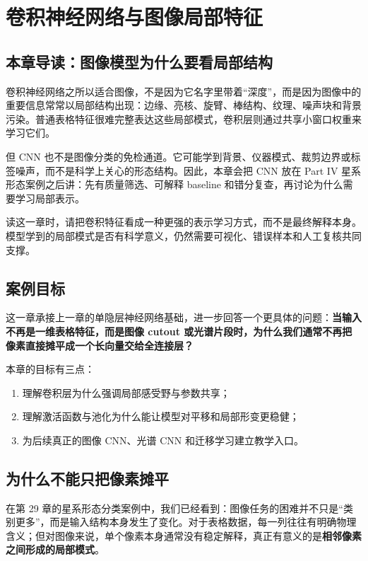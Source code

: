 \chapter{卷积神经网络与图像局部特征}

\section{本章导读：图像模型为什么要看局部结构}

卷积神经网络之所以适合图像，不是因为它名字里带着“深度”，而是因为图像中的重要信息常常以局部结构出现：边缘、亮核、旋臂、棒结构、纹理、噪声块和背景污染。普通表格特征很难完整表达这些局部模式，卷积层则通过共享小窗口权重来学习它们。

但 CNN 也不是图像分类的免检通道。它可能学到背景、仪器模式、裁剪边界或标签噪声，而不是科学上关心的形态结构。因此，本章会把 CNN 放在 Part IV 星系形态案例之后讲：先有质量筛选、可解释 baseline 和错分复查，再讨论为什么需要学习局部表示。

读这一章时，请把卷积特征看成一种更强的表示学习方式，而不是最终解释本身。模型学到的局部模式是否有科学意义，仍然需要可视化、错误样本和人工复核共同支撑。

\section{案例目标}

这一章承接上一章的单隐层神经网络基础，进一步回答一个更具体的问题：\textbf{当输入不再是一维表格特征，而是图像 cutout 或光谱片段时，为什么我们通常不再把像素直接摊平成一个长向量交给全连接层？}

本章的目标有三点：

\begin{enumerate}
    \item 理解卷积层为什么强调局部感受野与参数共享；
    \item 理解激活函数与池化为什么能让模型对平移和局部形变更稳健；
    \item 为后续真正的图像 CNN、光谱 CNN 和迁移学习建立教学入口。
\end{enumerate}

\section{为什么不能只把像素摊平}

在第 29 章的星系形态分类案例中，我们已经看到：图像任务的困难并不只是“类别更多”，而是输入结构本身发生了变化。对于表格数据，每一列往往有明确物理含义；但对图像来说，单个像素本身通常没有稳定解释，真正有意义的是\textbf{相邻像素之间形成的局部模式}。


